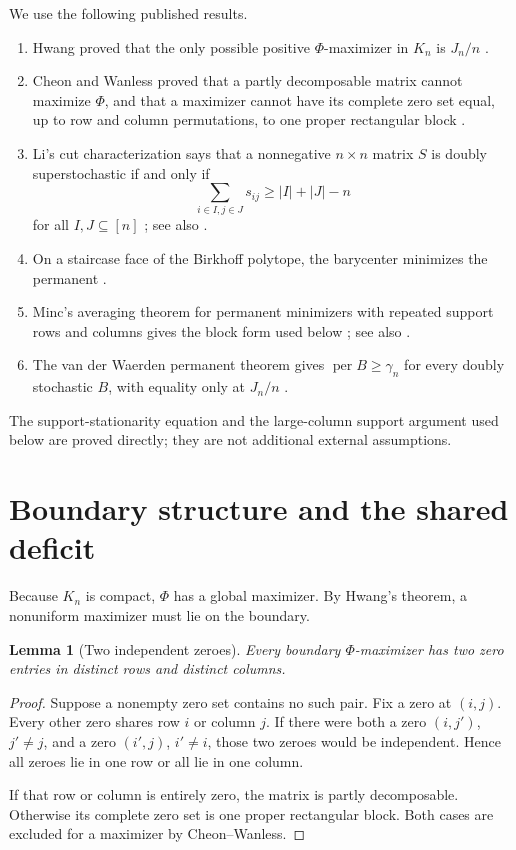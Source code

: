 \documentclass[11pt]{article}
\newtheorem{lemma}[theorem]{Lemma}
\theoremstyle{remark}
\newcommand{\per}{\operatorname{per}}
\begin{document}
We use the following published results.
\begin{enumerate}
\item Hwang proved that the only possible positive $\Phi$-maximizer in $K_n$
is $J_n/n$ \cite{Hwang1986}.
\item Cheon and Wanless proved that a partly decomposable matrix cannot
maximize $\Phi$, and that a maximizer cannot have its complete zero set equal,
up to row and column permutations, to one proper rectangular block
\cite[Theorems 3.2 and 3.7]{CheonWanless2012}.
\item Li's cut characterization says that a nonnegative $n\times n$ matrix
$S$ is doubly superstochastic if and only if
\[
 \sum_{i\in I,j\in J}s_{ij}\ge |I|+|J|-n
\]
for all $I,J\subseteq[n]$ \cite{Li1990}; see also
\cite[Lemma 2.2]{CheonWanless2012}.
\item On a staircase face of the Birkhoff polytope, the barycenter minimizes
the permanent \cite{Hwang1985}.
\item Minc's averaging theorem for permanent minimizers with repeated support
rows and columns gives the block form used below \cite[Theorem 1]{Minc1984};
see also \cite[Section 2]{PulaSongWanless2011}.
\item The van der Waerden permanent theorem gives $\per B\ge\gamma_n$ for
every doubly stochastic $B$, with equality only at $J_n/n$
\cite{Egorychev1981,Falikman1981}.
\end{enumerate}
The support-stationarity equation and the large-column support argument used
below are proved directly; they are not additional external assumptions.

\section{Boundary structure and the shared deficit}

Because $K_n$ is compact, $\Phi$ has a global maximizer.  By Hwang's theorem,
a nonuniform maximizer must lie on the boundary.

\begin{lemma}[Two independent zeroes]\label{lem:independent-zeros}
Every boundary $\Phi$-maximizer has two zero entries in distinct rows and
distinct columns.
\end{lemma}
\begin{proof}
Suppose a nonempty zero set contains no such pair.  Fix a zero at $(i,j)$.
Every other zero shares row $i$ or column $j$.  If there were both a zero
$(i,j')$, $j'\ne j$, and a zero $(i',j)$, $i'\ne i$, those two zeroes would be
independent.  Hence all zeroes lie in one row or all lie in one column.

If that row or column is entirely zero, the matrix is partly decomposable.
Otherwise its complete zero set is one proper rectangular block.  Both cases
are excluded for a maximizer by Cheon--Wanless.
\end{proof}
\end{document}

